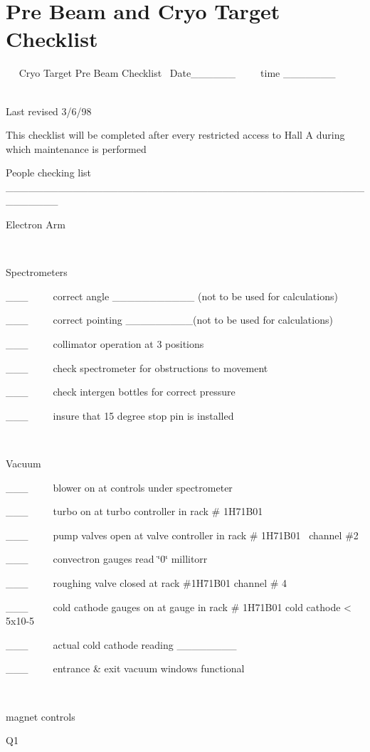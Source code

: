 \section{Pre Beam and Cryo Target Checklist }
~
~Cryo Target Pre Beam Checklist~ Date\_\_\_\_\_\_~~~~~time \_\_\_\_\_\_\_~~ 

~~~~~~~~~~~~~~~~~~~~~~~~~~~~~~~~~~~~~~~~~~~~~~~~~~~~~~~~~~~~~~~~~~~~~~~~Last
revised 3/6/98

This checklist will be completed after every restricted access to Hall A during
which maintenance is performed

People checking list \_\_\_\_\_\_\_\_\_\_\_\_\_\_\_\_\_\_\_\_\_\_\_\_\_\_\_\_\_\_\_\_\_\_\_\_\_\_\_\_\_\_\_\_\_\_\_\_\_\_\_\_\_\_\_

Electron Arm

~

Spectrometers

\_\_\_~~~~~correct angle \_\_\_\_\_\_\_\_\_\_\_ (not to be used for calculations)

\_\_\_~~~~~correct pointing \_\_\_\_\_\_\_\_\_(not to be used for calculations)

\_\_\_~~~~~collimator operation at 3 positions

\_\_\_~~~~~check spectrometer for obstructions to movement

\_\_\_~~~~~check intergen bottles for correct pressure

\_\_\_~~~~~insure that 15 degree stop pin is installed

~

Vacuum 

\_\_\_~~~~~blower on at controls under spectrometer

\_\_\_~~~~~turbo on at turbo controller in rack \# 1H71B01

\_\_\_~~~~~pump valves open at valve controller in rack \# 1H71B01~ channel
\#2 

\_\_\_~~~~~convectron gauges read \char`\"{}0\char`\"{} millitorr 

\_\_\_~~~~~roughing valve closed at rack \#1H71B01 channel \# 4 

\_\_\_~~~~~cold cathode gauges on at gauge in rack \# 1H71B01 cold cathode < 5x10-5

\_\_\_~~~~~actual cold cathode reading \_\_\_\_\_\_\_\_

\_\_\_~~~~~entrance \& exit vacuum windows functional

~

magnet controls

Q1

